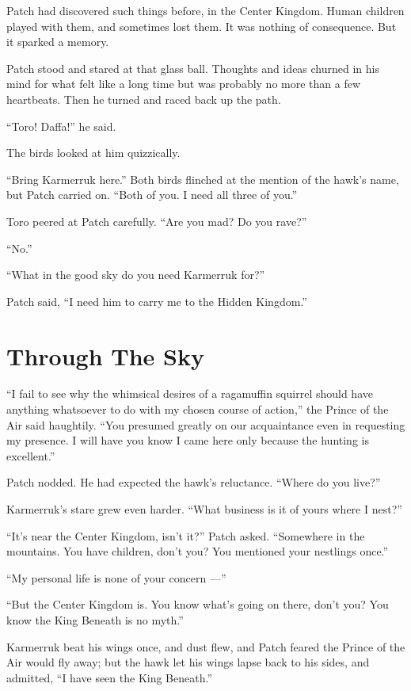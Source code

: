 \documentclass[ebook,oneside,openany,12pt]{memoir}
\begin{document}
Patch had discovered such things before, in the Center Kingdom. Human
children played with them, and sometimes lost them. It was nothing of
consequence. But it sparked a memory.

Patch stood and stared at that glass ball. Thoughts and ideas churned
in his mind for what felt like a long time but was probably no more
than a few heartbeats. Then he turned and raced back up the path.

“Toro! Daffa!” he said.

The birds looked at him quizzically.

“Bring Karmerruk here.” Both birds flinched at the mention of the
hawk’s name, but Patch carried on. “Both of you. I need all three of
you.”

Toro peered at Patch carefully. “Are you mad? Do you rave?”

“No.”

“What in the good sky do you need Karmerruk for?”

Patch said, “I need him to carry me to the Hidden Kingdom.”


\section{Through The Sky}

“I fail to see why the whimsical desires of a ragamuffin squirrel
should have anything whatsoever to do with my chosen course of
action,” the Prince of the Air said haughtily. “You presumed greatly
on our acquaintance even in requesting my presence. I will have you
know I came here only because the hunting is excellent.”

Patch nodded. He had expected the hawk’s reluctance. “Where do you
live?”

Karmerruk’s stare grew even harder. “What business is it of yours
where I nest?”

“It’s near the Center Kingdom, isn’t it?” Patch asked. “Somewhere in
the mountains. You have children, don’t you? You mentioned your
nestlings once.”

“My personal life is none of your concern —”

“But the Center Kingdom is. You know what’s going on there, don’t you?
You know the King Beneath is no myth.”

Karmerruk beat his wings once, and dust flew, and Patch feared the
Prince of the Air would fly away; but the hawk let his wings lapse
back to his sides, and admitted, “I have seen the King Beneath.”
\end{document}
